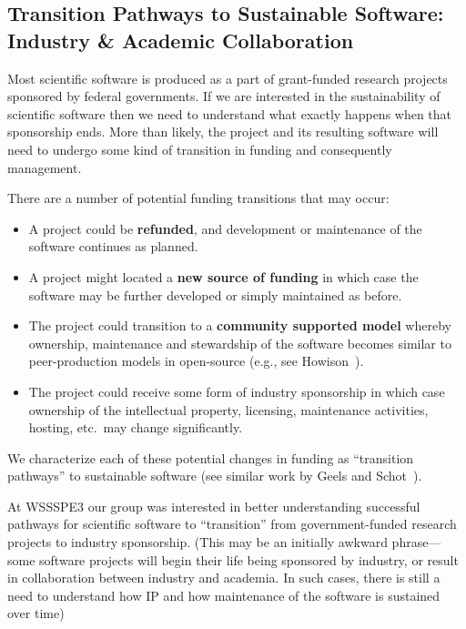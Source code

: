 \subsection{Transition Pathways to Sustainable Software: Industry \& Academic Collaboration} 


Most scientific software is produced as a part of grant-funded research projects
sponsored by federal governments. If we are interested in the sustainability of
scientific software then we need to understand what exactly happens when that
sponsorship ends. More than likely, the project and its resulting software will
need to undergo some kind of transition in funding and consequently management.

There are a number of potential funding transitions that may occur:  
%
\begin{itemize}

\item A project could be \textbf{refunded}, and development or maintenance of
the software continues as planned.

\item A project might located a \textbf{new source of funding} in which case the
software may be further developed or simply maintained as before.

\item The project could transition to a \textbf{community supported model}
whereby ownership, maintenance and stewardship of the software becomes similar
to peer-production models in open-source (e.g., see
Howison~\cite{howison_sustaining_2015}).

\item The project could receive some form of industry sponsorship in which case
ownership of the intellectual property, licensing, maintenance activities,
hosting, etc.\ may change significantly.

\end{itemize}

We characterize each of these potential changes in funding as ``transition
pathways'' to sustainable software (see similar work by Geels and
Schot~\cite{Geels:2007}).

At WSSSPE3 our group was interested in better understanding successful pathways
for scientific software to ``transition'' from government-funded research
projects to industry sponsorship. (This may be an initially awkward
phrase---some software projects will begin their life being sponsored by
industry, or result in collaboration between industry and academia. In such
cases, there is still a need to understand how IP and how maintenance of the
software is sustained over time)

